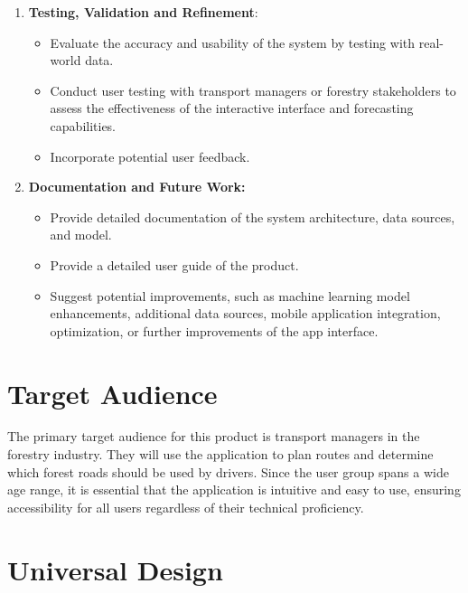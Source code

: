 \begin{enumerate}
    \item \textbf{Testing, Validation and Refinement}:
    \begin{itemize}
        \item Evaluate the accuracy and usability of the system by testing with real-world data.
        \item Conduct user testing with transport managers or forestry stakeholders to assess the effectiveness of the interactive interface and forecasting capabilities.
        \item Incorporate potential user feedback.
    \end{itemize} 
    
    \item \textbf{Documentation and Future Work:}
    \begin{itemize}
        \item Provide detailed documentation of the system architecture, data sources, and model.
        \item Provide a detailed user guide of the product.
        \item Suggest potential improvements, such as machine learning model enhancements, additional data sources, mobile application integration, optimization, or further improvements of the app interface.
    \end{itemize}
\end{enumerate}
\section{Target Audience}
The primary target audience for this product is transport managers in the forestry industry. They will use the application to plan routes and determine which forest roads should be used by drivers. Since the user group spans a wide age range, it is essential that the application is intuitive and easy to use, ensuring accessibility for all users regardless of their technical proficiency.

\section{Universal Design}

